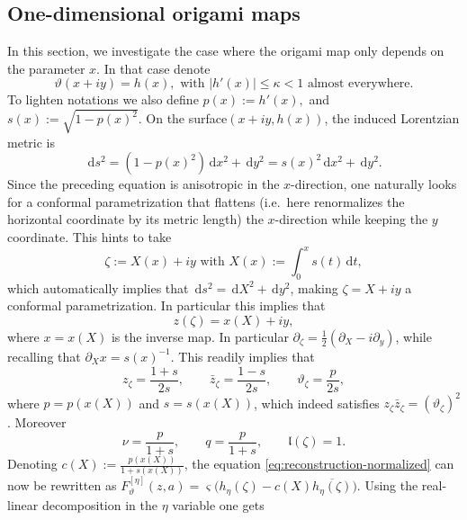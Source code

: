 \documentclass[reqno]{amsart}
\numberwithin{equation}{section}
\theoremstyle{definition}
\theoremstyle{remark}
\providecommand{\dd}{\,\mathrm d}
\providecommand{\ellm}{\mathfrak l}
\begin{document}
\subsection{One-dimensional origami maps}
In this section, we investigate the case where the origami map  only depends on the parameter $x$. In that case denote 
\begin{equation}\label{eq:one-dimensional-profile}
        \vartheta(x+iy)=h(x),
      \textrm{ with }  |h'(x)|\leq \kappa<1 \textrm{ almost everywhere.}
\end{equation}
To lighten notations we also define $  p(x):=h'(x),
        $ and $ s(x):=\sqrt{1-p(x)^2}$. On the surface$(x+iy,h(x))$, the induced Lorentzian metric is
\begin{equation}\label{eq:one-dimensional-induced-metric}
        \dd s^2=(1-p(x)^2)\dd x^2+\dd y^2=s(x)^2\dd x^2+\dd y^2.
\end{equation}
Since the preceding equation is anisotropic in the $x$-direction, one naturally looks for a conformal parametrization that flattens (i.e.\ here renormalizes the horizontal coordinate by its metric length) the $x$-direction while keeping the $y$ coordinate. This hints to take \begin{equation}\label{eq:one-dimensional-X}
        \zeta:=X(x)+iy \textrm{ with } X(x):=\int_0^x s(t)\dd t,
\end{equation}
which automatically implies that $\dd s^2=\dd X^2+\dd y^2$, making $\zeta=X+iy$ a conformal parametrization. In particular this implies that 
\begin{equation}\label{eq:one-dimensional-parametrization}
        z(\zeta)=x(X)+iy,
\end{equation}
where $x=x(X)$ is the inverse map. In particular $\partial_\zeta=\frac12(\partial_X-i\partial_y)$, while recalling that $
        \partial_X x=s(x)^{-1}$. This readily implies that 
\begin{equation}\label{eq:one-dimensional-derivatives}
        z_\zeta=\frac{1+s}{2s},
        \qquad
        \bar z_\zeta=\frac{1-s}{2s},
        \qquad
        \vartheta_\zeta=\frac{p}{2s},
\end{equation}
where $p=p(x(X))$ and $s=s(x(X))$, which indeed satisfies $ z_\zeta\bar z_\zeta =(\vartheta_\zeta)^2 $.  Moreover
\begin{equation}\label{eq:one-dimensional-q}
        \nu=\frac{p}{1+s},
        \qquad
        q=\frac{p}{1+s},
        \qquad
        \ellm(\zeta)=1.
\end{equation}
Denoting  $c(X):=\frac{p(x(X))}{1+s(x(X))}$, the equation \eqref{eq:reconstruction-normalized} can now be rewritten as $ F^{[\eta]}_\vartheta(z,a)=\varsigma\bigl(h_\eta(\zeta)-c(X)\overline{h_\eta(\zeta)}\bigr)$. Using the real-linear decomposition in the $\eta $ variable one gets
\end{document}
